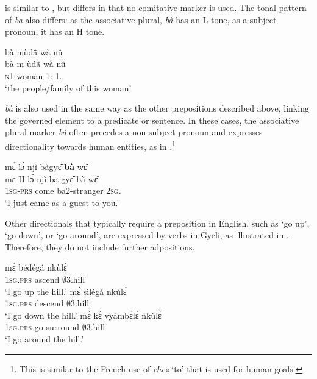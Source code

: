 \noindent {} is similar to , but differs in that no comitative marker is used. The tonal pattern of {\itshape ba} also differs: as the associative plural, {\itshape bà} has an L tone, as a subject pronoun, it has an H tone.

\ea \label{AP2}
  \glll bà mùdã̂ wà nû \\
       bà m-ùdã̂ wà nû \\
          {\AP} \textsc{n}1-woman 1:{\ATT} 1.{\DEM}.{\PROX}  \\
    \trans `the people/family of this woman'
\z

{\itshape bà} is also used in the same way as the other prepositions described above, {\pagebreak}linking the governed element to a predicate or sentence. In these cases, the as\-sociative plural marker {\itshape bà} often precedes a non-subject pronoun and expresses directionality towards human entities, as in .\footnote{This is similar to the French use of {\itshape chez} `to' that is used for human goals.}

\ea \label{AP3}
  \glll mɛ́ lɔ́ njì bàgyɛ̃̂ {\bfseries bà} wɛ̂ \\
       mɛ-H lɔ́ njì ba-gyɛ̃̂ bà wɛ̂ \\
       1\textsc{sg}-\textsc{prs} {\RETRO} come ba2-stranger {\AP} 2\textsc{sg}.{\OBJ}  \\
    \trans `I just came as a guest to you.'
\z


Other directionals that  typically require a preposition  in English, such as `go up', `go down', or `go around', are expressed by verbs in Gyeli, as illustrated in . Therefore, they do not include further adpositions.

\ea \label{directionals}
  \ea \label{directionals1}
  \gll    mɛ́ bédégá nkùlɛ́\\
              1\textsc{sg}.\textsc{prs} ascend $\emptyset$3.hill \\
    \trans `I go up the hill.'
\ex\label{directionals2}
  \gll    mɛ́ sìlégá nkùlɛ́\\
              1\textsc{sg}.\textsc{prs} descend $\emptyset$3.hill \\
    \trans `I go down the hill.'
\ex\label{directionals3}
  \gll    mɛ́ kɛ́ vyàmbɛ̀lɛ̀ nkùlɛ́\\
              1\textsc{sg}.\textsc{prs} go surround $\emptyset$3.hill \\
    \trans `I go around the hill.'
\z
\z



